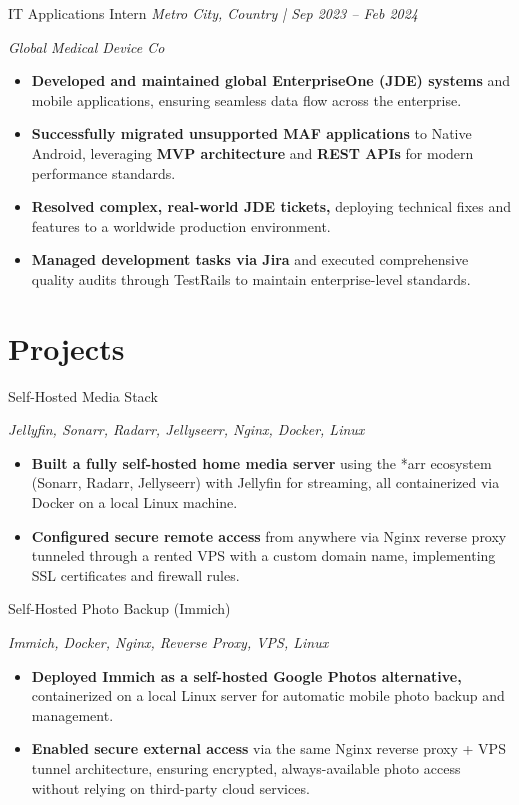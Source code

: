 \documentclass[11pt]{article}
\newcommand{\job}[3]{%
  \vspace{4pt}%
  {\fontsize{9pt}{12pt}\poppinsmedium\color{accent}#1}%
  \hfill
  {\fontsize{9pt}{12pt}\poppinslight\itshape #2}\par
  {\fontsize{9pt}{12pt}\poppinslight\itshape #3}\par
}
\begin{document}
\job{IT Applications Intern}{Metro City, Country | Sep 2023 -- Feb 2024}{Global Medical Device Co}
\begin{itemize}
  \item \textbf{Developed and maintained global EnterpriseOne (JDE) systems}
        and mobile applications, ensuring seamless data flow across the enterprise.
  \item \textbf{Successfully migrated unsupported MAF applications} to Native
        Android, leveraging \textbf{MVP architecture} and \textbf{REST APIs}
        for modern performance standards.
  \item \textbf{Resolved complex, real-world JDE tickets,} deploying technical
        fixes and features to a worldwide production environment.
  \item \textbf{Managed development tasks via Jira} and executed comprehensive
        quality audits through TestRails to maintain enterprise-level standards.
\end{itemize}

\section{Projects}

\job{Self-Hosted Media Stack}{}{Jellyfin, Sonarr, Radarr, Jellyseerr, Nginx, Docker, Linux}
\begin{itemize}
  \item \textbf{Built a fully self-hosted home media server} using the *arr
        ecosystem (Sonarr, Radarr, Jellyseerr) with Jellyfin for streaming, all
        containerized via Docker on a local Linux machine.
  \item \textbf{Configured secure remote access} from anywhere via Nginx reverse
        proxy tunneled through a rented VPS with a custom domain name,
        implementing SSL certificates and firewall rules.
\end{itemize}

\job{Self-Hosted Photo Backup (Immich)}{}{Immich, Docker, Nginx, Reverse Proxy, VPS, Linux}
\begin{itemize}
  \item \textbf{Deployed Immich as a self-hosted Google Photos alternative,}
        containerized on a local Linux server for automatic mobile photo
        backup and management.
  \item \textbf{Enabled secure external access} via the same Nginx reverse
        proxy + VPS tunnel architecture, ensuring encrypted, always-available
        photo access without relying on third-party cloud services.
\end{itemize}
\end{document}
